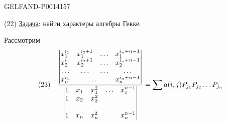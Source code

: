 \begin{GelfandAdjacentEvidence}{GELFAND-P001415}{7}


(22) \uline{Задача}: найти характеры алгебры Гекке.

Рассмотрим
\[
\text{(23)}\quad
\frac{
 \begin{vmatrix}
 x_1^{i_1}&x_1^{i_2+1}&\ldots&x_1^{i_n+n-1}\\
 x_2^{i_1}&x_2^{i_2+1}&\ldots&x_2^{i_n+n-1}\\
 \ldots&\ldots&\ldots&\ldots\\
 x_n^{i_1}&\multicolumn{2}{c}{\ldots}&x_n^{i_n+n-1}
 \end{vmatrix}
}{
 \begin{vmatrix}
 1&x_1&x_1^2&\ldots&x_1^{n-1}\\
 1&x_2&x_2^2&&\\
 &&&&\\
 1&x_n&x_n^2&&x_n^{n-1}
 \end{vmatrix}
}
=\sum a(i,j)P_{j_1}P_{j_2}\ldots P_{j_n}
\]
\end{GelfandAdjacentEvidence}



